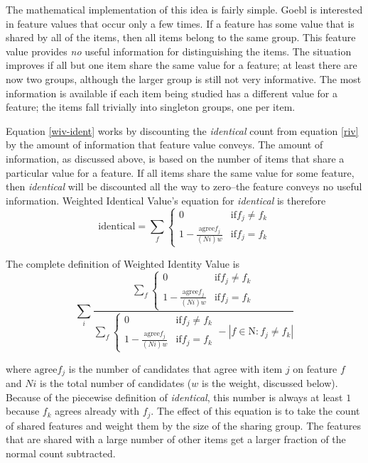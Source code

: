 \documentclass[11pt]{article}
\begin{document}
The mathematical implementation of this idea is fairly simple. Goebl
is interested in feature values that occur only a few times. If a
feature has some value that is shared by all of the items, then all
items belong to the same group. This feature value provides {\it no}
useful information for distinguishing the items.  The situation
improves if all but one item share the same value for a feature; at
least there are now two groups, although the larger group is still not
very informative.  The most information is available if each item
being studied has a different value for a feature; the items fall
trivially into singleton groups, one per item.

Equation \ref{wiv-ident} works by discounting
the \textit{identical} count from equation \ref{riv} by
the amount of information that feature value conveys. The
amount of information, as discussed above, is based on the number of
items that share a particular value for a feature. If all items share
the same value for some feature, then \textit{identical} will be discounted all the
way to zero--the feature conveys no useful information.
Weighted Identical Value's equation for \textit{identical} is
therefore
\begin{equation}
  \textrm{identical} = \sum_f \left\{
  \begin{array}{ll}
    0 & \textrm{if} f_j \neq f_k \\
    1 - \frac{\textrm{agree}f_{j}}{(Ni)w} & \textrm{if} f_j = f_k
  \end{array} \right.
\label{wiv-ident}
\end{equation}

\noindent{}The complete definition of Weighted Identity Value is
\begin{equation} \sum_i \frac{\sum_f \left\{
  \begin{array}{ll}
    0 & \textrm{if} f_j \neq f_k \\
    1 - \frac{\textrm{agree}f_j} {(Ni)w} & \textrm{if} f_j = f_k
\end{array} \right.}
  {\sum_f \left\{
  \begin{array}{ll}
    0 & \textrm{if} f_j \neq f_k \\
    1 - \frac{\textrm{agree}f_j} {(Ni)w} & \textrm{if} f_j = f_k
    \end{array} \right. - |f \in \textrm{N} : f_j \neq f_k|}
  \label{wiv-full}
  \end{equation}

  \noindent{}where $\textrm{agree}f_{j}$ is the number of candidates that agree
  with item $j$ on feature $f$ and $Ni$ is the total number of
  candidates ($w$ is the weight, discussed below). Because of the
  piecewise definition of \textit{identical}, this number is always at
  least $1$ because $f_k$ agrees already with $f_j$. The effect of
  this equation is to take the count of shared features and weight
  them by the size of the sharing group. The features that are shared
  with a large number of other items get a larger fraction of the normal
  count subtracted.
\end{document}
